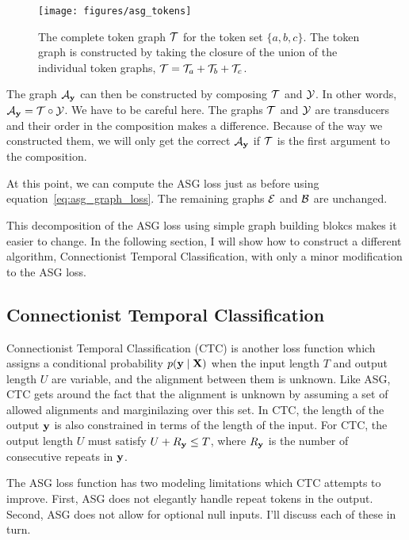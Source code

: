 \begin{figure}
    \centering
    \texttt{[image: figures/asg\_tokens]}
    \caption{The complete token graph $\mathcal{T}$ for the token set $\{a, b, c\}$.
    The token graph is constructed by taking the closure of the union of the
    individual token graphs, $\mathcal{T} = \mathcal{T}_a + \mathcal{T}_b + \mathcal{T}_c$.}
    \label{fig:asg_tokens}
\end{figure}

The graph $\mathcal{A}_{\bf y}$ can then be constructed by composing $\mathcal{T}$ and $\mathcal{Y}$. In
other words, $\mathcal{A}_{\bf y} = \mathcal{T} \circ \mathcal{Y}$. We have to be careful here. The graphs
$\mathcal{T}$ and $\mathcal{Y}$ are transducers and their order in the composition makes a
difference. Because of the way we constructed them, we will only get the
correct $\mathcal{A}_{\bf y}$ if $\mathcal{T}$ is the first argument to the composition.

At this point, we can compute the ASG loss just as before using
equation~\ref{eq:asg_graph_loss}. The remaining graphs $\mathcal{E}$ and $\mathcal{B}$ are
unchanged.

This decomposition of the ASG loss using simple graph building blokcs makes it
easier to change. In the following section, I will show how to construct a
different algorithm, Connectionist Temporal Classification, with only a minor
modification to the ASG loss.

\subsection{Connectionist Temporal Classification}

Connectionist Temporal Classification (CTC) is another loss function which
assigns a conditional probability $p({\bf y} \mid {\bf X})$ when the input length $T$
and output length $U$ are variable, and the alignment between them is unknown.
Like ASG, CTC gets around the fact that the alignment is unknown by assuming a
set of allowed alignments and marginilazing over this set. In CTC, the length
of the output ${\bf y}$ is also constrained in terms of the length of the input.
For CTC, the output length $U$ must satisfy $U + R_{\bf y} \le T$, where $R_{\bf y}$ is
the number of consecutive repeats in ${\bf y}$.

The ASG loss function has two modeling limitations which CTC attempts to
improve. First, ASG does not elegantly handle repeat tokens in the output.
Second, ASG does not allow for optional null inputs. I'll discuss each of these
in turn.

